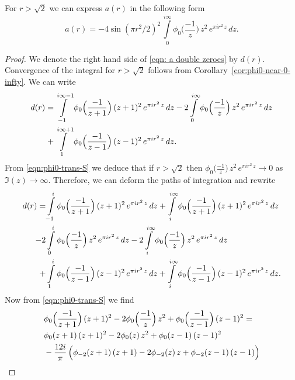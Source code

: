 \begin{proposition}
\label{prop:a-double-zeros}
For $r>\sqrt{2}$ we can express $a(r)$ in the following form
\begin{equation}\label{eqn: a double zeroes}
    a(r)=-4\sin(\pi r^2/2)^2\,\int\limits_{0}^{i\infty}\phi_0\Big(\frac{-1}{z}\Big)\,z^2\,e^{\pi i r^2 \,z}\,dz.
\end{equation}
\end{proposition}
\begin{proof}
We denote the right hand side of \eqref{eqn: a double zeroes} by $d(r)$.
Convergence of the integral for $r > \sqrt{2}$ follows from Corollary~\ref{cor:phi0-near-0-infty}.
We can write %
\begin{align}
    d(r)=&\int\limits_{-1}^{i\infty-1}\phi_0\Big(\frac{-1}{z+1}\Big)\,(z+1)^2\,e^{\pi i r^2 \,z}\,dz-
    2\int\limits_{0}^{i\infty}\phi_0\Big(\frac{-1}{z}\Big)\,z^2\,e^{\pi i r^2 \,z}\,dz\notag\\
    +&\int\limits_{1}^{i\infty+1}\phi_0\Big(\frac{-1}{z-1}\Big)\,(z-1)^2\,e^{\pi i r^2 \,z}\,dz.\notag
\end{align}
From \eqref{eqn:phi0-trans-S} we deduce that if $r>\sqrt{2}$ then
$\phi_0\Big(\frac{-1}{z}\Big)\,z^2\,e^{\pi i r^2 \,z}\to 0$ as $\Im(z)\to\infty$. Therefore, we can deform the paths of integration
and rewrite
\begin{align}
    d(r)=&\int\limits_{-1}^{i}\phi_0\Big(\frac{-1}{z+1}\Big)\,(z+1)^2\,e^{\pi i r^2 \,z}\,dz
    +\int\limits_{i}^{i\infty}\phi_0\Big(\frac{-1}{z+1}\Big)\,(z+1)^2\,e^{\pi i r^2 \,z}\,dz\notag\\
    -2&\int\limits_{0}^{i}\phi_0\Big(\frac{-1}{z}\Big)\,z^2\,e^{\pi i r^2 \,z}\,dz
    -2\int\limits_{i}^{i\infty}\phi_0\Big(\frac{-1}{z}\Big)\,z^2\,e^{\pi i r^2 \,z}\,dz\notag\\
    +&\int\limits_{1}^{i}\phi_0\Big(\frac{-1}{z-1}\Big)\,(z-1)^2\,e^{\pi i r^2 \,z}\,dz
    +\int\limits_{i}^{i\infty}\phi_0\Big(\frac{-1}{z-1}\Big)\,(z-1)^2\,e^{\pi i r^2 \,z}\,dz.\notag
\end{align}
Now from \eqref{eqn:phi0-trans-S} we find
\begin{align}&\phi_0\Big(\frac{-1}{z+1}\Big)\,(z+1)^2-2\phi_0\Big(\frac{-1}{z}\Big)\,z^2+
\phi_0\Big(\frac{-1}{z-1}\Big)\,(z-1)^2=\notag\\
&\phi_0(z+1)\,(z+1)^2-2\phi_0(z)\,z^2+\phi_0(z-1)\,(z-1)^2\notag\\
&-\frac{12i}{\pi}\,\Big(\phi_{-2}(z+1)\,(z+1)-2\phi_{-2}(z)\,z+\phi_{-2}(z-1)\,(z-1)\Big)\notag\\

\end{align}
\end{proof}
